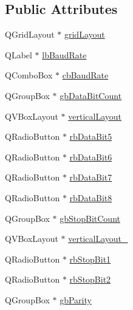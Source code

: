 \subsection*{Public Attributes}
\begin{DoxyCompactItemize}
\item 
Q\-Grid\-Layout $\ast$ \hyperlink{class_ui__mdt_serial_port_config_widget_a5d484ab611a79ce3bb00c9eabae59641}{grid\-Layout}
\item 
Q\-Label $\ast$ \hyperlink{class_ui__mdt_serial_port_config_widget_a6df63f8e5c4434b54a34168da9be0845}{lb\-Baud\-Rate}
\item 
Q\-Combo\-Box $\ast$ \hyperlink{class_ui__mdt_serial_port_config_widget_a453cdc3ba0f2ca103e77ebc77e1b1439}{cb\-Baud\-Rate}
\item 
Q\-Group\-Box $\ast$ \hyperlink{class_ui__mdt_serial_port_config_widget_a93e418f3a8968563f9d76deaa0277e2b}{gb\-Data\-Bit\-Count}
\item 
Q\-V\-Box\-Layout $\ast$ \hyperlink{class_ui__mdt_serial_port_config_widget_a1405ab1f15dea4e2e676a0e88c6f8ea2}{vertical\-Layout}
\item 
Q\-Radio\-Button $\ast$ \hyperlink{class_ui__mdt_serial_port_config_widget_a6ad8c2d98f9e8820705f1ac86cdd126d}{rb\-Data\-Bit5}
\item 
Q\-Radio\-Button $\ast$ \hyperlink{class_ui__mdt_serial_port_config_widget_ac602051e661321ed5426f5cb7b26676c}{rb\-Data\-Bit6}
\item 
Q\-Radio\-Button $\ast$ \hyperlink{class_ui__mdt_serial_port_config_widget_a8fc4228fea093c475ca2f94c562d50c5}{rb\-Data\-Bit7}
\item 
Q\-Radio\-Button $\ast$ \hyperlink{class_ui__mdt_serial_port_config_widget_a57cc2e4af17b1d557ad36e698be8a014}{rb\-Data\-Bit8}
\item 
Q\-Group\-Box $\ast$ \hyperlink{class_ui__mdt_serial_port_config_widget_af4773ada5dc036975dafd930a3cd2402}{gb\-Stop\-Bit\-Count}
\item 
Q\-V\-Box\-Layout $\ast$ \hyperlink{class_ui__mdt_serial_port_config_widget_a61658b3c6fe1c0287920435b9995f1fd}{vertical\-Layout\-\_}
\item 
Q\-Radio\-Button $\ast$ \hyperlink{class_ui__mdt_serial_port_config_widget_a44b2250cbc0fdb06eccfe6352b276fe4}{rb\-Stop\-Bit1}
\item 
Q\-Radio\-Button $\ast$ \hyperlink{class_ui__mdt_serial_port_config_widget_a3cb2aaaf47c7aad387d4a81a5f0e963b}{rb\-Stop\-Bit2}
\item 
Q\-Group\-Box $\ast$ \hyperlink{class_ui__mdt_serial_port_config_widget_a43abf18fde6f20b3d3e29bb91b53a819}{gb\-Parity}

\end{DoxyCompactItemize}
